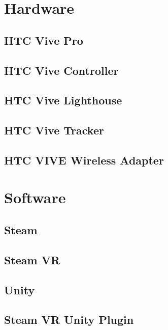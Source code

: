 \section{Hardware}
\lipsum[5-12]

\subsection{HTC Vive Pro}
\lipsum[5-12]

\subsection{HTC Vive Controller}
\lipsum[5-12]

\subsection{HTC Vive Lighthouse}
\lipsum[5-12]

\subsection{HTC Vive Tracker}
\lipsum[5-12]

\subsection{HTC VIVE Wireless Adapter }
\lipsum[5-12]

\section{Software}

\subsection{Steam}
\lipsum[5-12]

\subsection{Steam VR}
\lipsum[5-12]

\subsection{Unity}
\lipsum[5-12]

\subsection{Steam VR Unity Plugin}
\lipsum[5-12]

